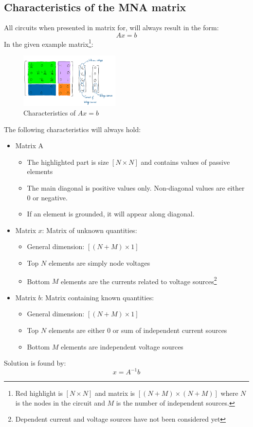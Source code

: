 \documentclass[a4paper, titlepage]{article}
\begin{document}
    \subsection{Characteristics of the MNA matrix}
    All circuits when presented in matrix for, will always result in the form:
    $$Ax = b$$
    In the given example matrix\footnote{Red highlight is $[N\times N]$ and matrix is $[(N+M)\times (N+M)]$ where 
    $N$ is the nodes in the circuit and $M$ is the number of independent sources.}:
    \begin{figure}[h]
        \centering
        \includegraphics[width=50mm,scale=1]{Highlighted matrix}
        \caption{Characteristics of $Ax = b$}
        \label{}
    \end{figure}
    \par
    The following characteristics will always hold:
    \begin{itemize}
        \item Matrix A
        \begin{itemize}
            \item The highlighted part is size $[N \times N]$ and contains values of passive elements
            \item The main diagonal is positive values only. Non-diagonal values are either 0 or negative.
            \item If an element is grounded, it will appear along diagonal. 
        \end{itemize}
        \item Matrix $x$: Matrix of unknown quantities:
        \begin{itemize}
            \item General dimension: $[(N+M)\times1]$
            \item Top $N$ elements are simply node voltages
            \item Bottom $M$ elements are the currents related to voltage sources\footnote{Dependent current and voltage sources have not been considered yet}
        \end{itemize}
        \item Matrix $b$: Matrix containing known quantities:
        \begin{itemize}
            \item General dimension: $[(N+M)\times1]$
            \item Top $N$ elements are either 0 or sum of independent current sources
            \item Bottom $M$ elements are independent voltage sources
        \end{itemize}
    \end{itemize}
    Solution is found by:
    $$x = A^{-1}b$$
    \vfill
\end{document}
